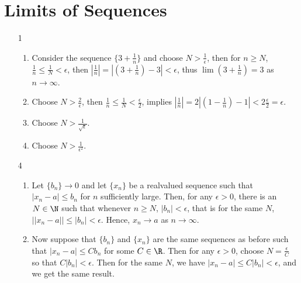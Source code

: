 
\section{Limits of Sequences}

\begin{enumerate}[label=(\arabic*)]
    \item[1]
        \begin{enumerate}

        \item Consider the sequence $\{3+\frac{1}{n}\}$ and choose $N>\frac{1}{\epsilon}$, 
        then for $n \geq N$,  $\frac{1}{n} \leq \frac{1}{N}<\epsilon$, then 
        $|\frac{1}{n}|=|(3+\frac{1}{n})-3|<\epsilon$, thus $\lim{(3+\frac{1}{n})}=3$ 
        as $n \rightarrow \infty$.
            
        \item Choose $N>\frac{2}{\epsilon}$, then $\frac{1}{n} \leq \frac{1}{N}<\frac{\epsilon}{2}$, 
        implies $|\frac{1}{n}|=2|(1-\frac{1}{n})-1|<2\frac{\epsilon}{2}=\epsilon$.

        \item Choose $N>\frac{1}{\sqrt{\epsilon}}$. 

        \item Choose $N>\frac{1}{\epsilon^2}$.
        \end{enumerate}

    \item[4] 
        \begin{enumerate}
            \item Let $\{b_n\} \rightarrow 0$ and let  $\{x_n\}$ be a realvalued 
            sequence such that  $|x_n-a| \leq b_n$ for  $n$ sufficiently large. 
            Then, for any  $\epsilon>0$, there is an  $N \in \N$ such  that whenever 
            $n \geq N$,  $|b_n|<\epsilon$, that is for the same  $N$,  $||x_n-a|| \leq |b_n|<\epsilon$. 
            Hence,  $x_n \rightarrow a$ as  $n \rightarrow \infty$.

        \item Now suppose that  $\{b_n\}$ and  $\{x_n\}$ are the same sequences as 
            before such that  $|x_n-a| \leq Cb_n$ for some  $C \in \R$. Then for any 
             $\epsilon>0$, choose  $N=\frac{\epsilon}{C}$ so that $C|b_n|<\epsilon$.  
             Then  for the same  $N$, we have  $|x_n-a| \leq C|b_n|<\epsilon$, and we 
             get the same result.
        \end{enumerate}


\end{enumerate}
